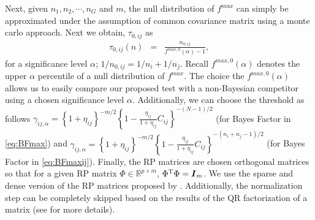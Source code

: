 \documentclass[12pt]{article}
\def\log{\hbox{log}}
\def\log{\hbox{log}}
\def\be{\begin{eqnarray}}
\def\ee{\end{eqnarray}}
\def\trans{^{\rm T}}
\newcommand{\uF}       {\mbox{\boldmath$F$}}
\newcommand{\uI}       {\mbox{\boldmath$I$}}
\newcommand{\uS}       {\mbox{\boldmath$S$}}
\newcommand{\uX}       {\mbox{\boldmath$X$}}
\begin{document}
Next, given $n_1,n_2, \cdots, n_{G}$ and $m$, the null distribution of $f^{max}$ can simply be approximated under the assumption of common covariance matrix using a monte carlo approach. Next we obtain, $\tau_{0,ij}$ as
\be
\tau_{0,ij}(n) &=& \frac{n_{0,ij}}{f^{max,0}(\alpha) - 1}, \label{eq:tau0}
\ee
for a significance level $\alpha$;  $1/n_{0,ij} = 1/n_{i} + 1/n_{j}$. Recall $f^{max,0}(\alpha)$ denotes the upper $\alpha$ percentile of a null distribution of $f^{max}$. The choice the $f^{max,0}(\alpha)$ allows us to easily compare our proposed test with a non-Bayesian competitor using a chosen significance level $\alpha$.
 Additionally, we can choose the threshold as follows $\gamma_{ij,\alpha} = \left\{ 1 + \eta_{ij}\right\}^{-m/2}\left\{ 1 - \frac{\eta_{ij}}{1 + \eta_{ij}} C_{ij} \right\}^{-(N -1)/2}$ (for Bayes Factor in \ref{eq:BFmax}) and  %
$\gamma_{ij,\alpha} = \left\{ 1 + \eta_{ij}\right\}^{-m/2}\left\{ 1 - \frac{\eta_{ij}}{1 + \eta_{ij}} C_{ij} \right\}^{-(n_i+n_j -1)/2}$ (for Bayes Factor in \ref{eq:BFmaxij}).
Finally, the RP matrices are chosen orthogonal matrices so that for a given RP matrix $\Phi \in \mathbb{R}^{p \times m}$,  $\Phi\trans\Phi = \uI_{m}$. We use the sparse and dense version of the RP matrices proposed by \cite{srivastava2014raptt}. Additionally, the normalization step can be completely skipped based on the results of the QR factorization of a matrix (see \citealp{zoh2018powerful} for more details).

\end{document}
